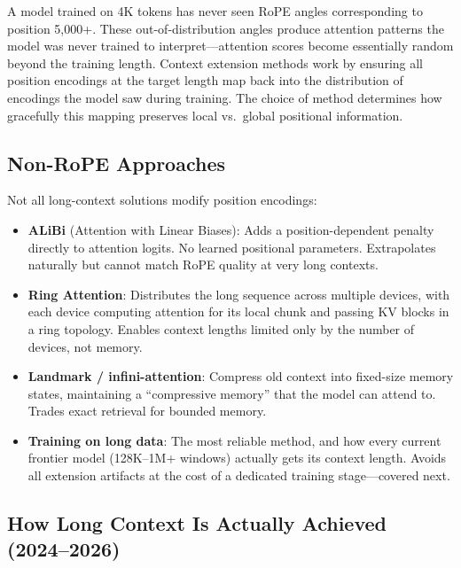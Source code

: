 \begin{keyinsight}
A model trained on 4K tokens has never seen RoPE angles corresponding to position 5,000+. These out-of-distribution angles produce attention patterns the model was never trained to interpret---attention scores become essentially random beyond the training length. Context extension methods work by ensuring all position encodings at the target length map back into the distribution of encodings the model saw during training. The choice of method determines how gracefully this mapping preserves local vs.\ global positional information.
\end{keyinsight}

\subsection{Non-RoPE Approaches}

Not all long-context solutions modify position encodings:

\begin{itemize}
    \item \textbf{ALiBi} (Attention with Linear Biases): Adds a position-dependent penalty directly to attention logits. No learned positional parameters. Extrapolates naturally but cannot match RoPE quality at very long contexts.
    \item \textbf{Ring Attention}: Distributes the long sequence across multiple devices, with each device computing attention for its local chunk and passing KV blocks in a ring topology. Enables context lengths limited only by the number of devices, not memory.
    \item \textbf{Landmark / infini-attention}: Compress old context into fixed-size memory states, maintaining a ``compressive memory'' that the model can attend to. Trades exact retrieval for bounded memory.
    \item \textbf{Training on long data}: The most reliable method, and how every current frontier model (128K--1M+ windows) actually gets its context length. Avoids all extension artifacts at the cost of a dedicated training stage---covered next.
\end{itemize}

\subsection{How Long Context Is Actually Achieved (2024--2026)}
\label{subsec:native_long_context}

